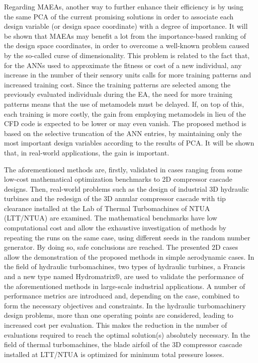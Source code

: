 Regarding MAEAs, another way to further enhance their efficiency is by using the same PCA of the current promising solutions in order to associate each design variable (or design space coordinate) with a degree of importance. It will be shown that MAEAs may benefit a lot from the importance-based ranking of the design space coordinates, in order to overcome a well-known problem caused by the so-called curse of dimensionality. This problem is related to the fact that, for the ANNs used to approximate the fitness or cost of a new individual, any increase in the number of their sensory units calls for more training patterns and increased training cost.  Since the training patterns are selected among the previously evaluated individuals during the EA, the need for more training patterns means that the use of metamodels must be delayed. If, on top of this, each training is more costly, the gain from employing metamodels in lieu of the CFD code is expected to be lower or may even vanish. The proposed method is based on the selective truncation of the ANN entries, by maintaining only the most important design variables according to the results of PCA. It will be shown that, in real-world applications, the gain is important.   

The aforementioned methods are, firstly, validated in cases ranging from  some low-cost mathematical optimization benchmarks to 2D compressor cascade designs. Then, real-world problems such as the design of industrial 3D hydraulic turbines and the redesign of the 3D annular compressor cascade with tip clearance installed at the Lab of Thermal Turbomachines of NTUA (LTT/NTUA) are examined. The mathematical benchmarks have low computational cost and allow the exhaustive investigation of methods by repeating the runs on the same case, using different seeds in the random number generator. By doing so, safe conclusions are reached. The presented 2D cases allow the demonstration of the proposed methods in simple aerodynamic cases. In the field of hydraulic turbomachines, two types of hydraulic turbines, a Francis and a new type named Hydromatrix$\circledR$, are used to validate the performance of the aforementioned methods in large-scale industrial applications. A number of performance metrics are introduced and, depending on the case, combined to form the necessary objectives and constraints. In the hydraulic turbomachinery design problems, more than one operating points are considered, leading to increased cost per evaluation. This makes the reduction in the number of evaluations required to reach the optimal solution(s) absolutely necessary.  In the field of thermal turbomachines, the blade airfoil of the 3D compressor cascade installed at LTT/NTUA is optimized for minimum total pressure losses.     


